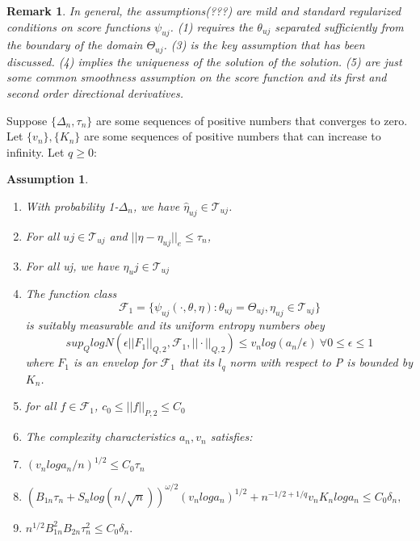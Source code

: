\documentclass{article}
\newtheorem{remark}[theorem]{Remark}
\newtheorem{assumption}{Assumption}
\begin{document}
\begin{remark}
In general, the assumptions(???) are mild and standard regularized conditions on score functions $\psi_{uj}$. (1) requires the $\theta_{uj}$ separated sufficiently from the boundary of the domain $\Theta_{uj}$. (3) is the key assumption that has been discussed. (4) implies the uniqueness of the solution of the solution. (5) are just some common smoothness assumption on the score function and its first and second order directional derivatives. 

\end{remark}

Suppose $\{ \Delta_n,\tau_n\}$ are some sequences of positive numbers that converges to zero. Let $\{v_n\},\{K_n\}$ are some sequences of positive numbers that can increase to infinity. Let $q\geq 0$:
\begin{assumption}
    \begin{enumerate}
        \item With probability 1-$\Delta_n$, we have $\hat{\eta}_{uj}\in \mathcal{T}_{uj}$. 
        \item For all $uj\in \mathcal{T}_{uj} $ and $||\eta-\eta_{uj}||_e\leq \tau_n $,
        \item For all uj, we have $\eta_uj\in \mathcal{T}_{uj}$ 
        \item The function class 
        \begin{equation}
            \mathcal{F}_1=\{\psi_{uj}(\cdot, \theta, \eta ): \theta_{uj}=\Theta_{uj},\eta_{uj}\in \mathcal{T}_{uj} \}
        \end{equation}
        is suitably measurable and its uniform entropy numbers obey
        \begin{equation}
            sup_Q log N(\epsilon||F_1||_{Q,2},\mathcal{F}_1,||\cdot||_{Q,2})\leq v_n log(a_n/\epsilon) \ \forall 0\leq \epsilon \leq 1
        \end{equation}
        where $F_1$ is an envelop for $\mathcal{F}_1$ that its $l_q$ norm with respect to P is bounded by $K_n$. 
        \item for all $f \in \mathcal{F}_1$, $c_0\leq ||f||_{P,2}\leq C_0$
        \item The complexity characteristics $a_n,v_n$ satisfies:
        \item[(a)] $(v_n log a_n/n)^{1/2} \leq C_0\tau_n$
        \item[(b)]$(B_{1n}\tau_n + S_n log(n/\sqrt{n}))^{\omega/2}(v_n log a_n)^{1/2} + n^{-1/2+1/q} v_n K_n log a_n\leq C_0 \delta_n,$
        \item[(c)] $n^{1/2} B_{1n}^2 B_{2n} \tau_n^2\leq C_0\delta_n.$
    \end{enumerate}
\end{assumption}
\end{document}
